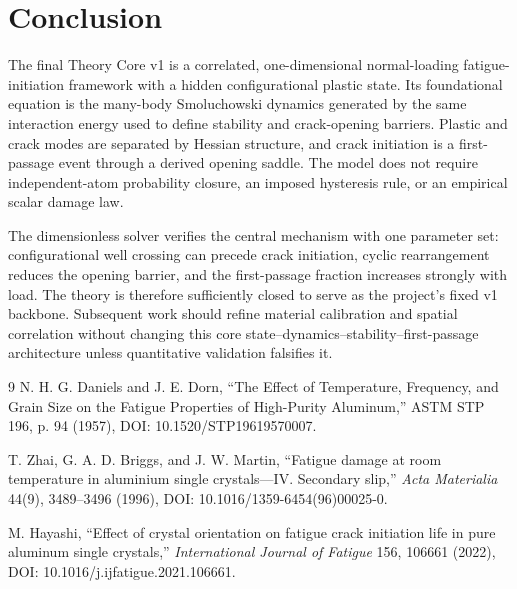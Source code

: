 \documentclass[11pt]{article}
\begin{document}
\section{Conclusion}
The final Theory Core v1 is a correlated, one-dimensional normal-loading fatigue-initiation framework with a hidden configurational plastic state. Its foundational equation is the many-body Smoluchowski dynamics generated by the same interaction energy used to define stability and crack-opening barriers. Plastic and crack modes are separated by Hessian structure, and crack initiation is a first-passage event through a derived opening saddle. The model does not require independent-atom probability closure, an imposed hysteresis rule, or an empirical scalar damage law.

The dimensionless solver verifies the central mechanism with one parameter set: configurational well crossing can precede crack initiation, cyclic rearrangement reduces the opening barrier, and the first-passage fraction increases strongly with load. The theory is therefore sufficiently closed to serve as the project's fixed v1 backbone. Subsequent work should refine material calibration and spatial correlation without changing this core state--dynamics--stability--first-passage architecture unless quantitative validation falsifies it.

\begin{thebibliography}{9}
N. H. G. Daniels and J. E. Dorn,
``The Effect of Temperature, Frequency, and Grain Size on the Fatigue Properties of High-Purity Aluminum,''
ASTM STP 196, p. 94 (1957), DOI: 10.1520/STP19619570007.

T. Zhai, G. A. D. Briggs, and J. W. Martin,
``Fatigue damage at room temperature in aluminium single crystals---IV. Secondary slip,''
\emph{Acta Materialia} 44(9), 3489--3496 (1996), DOI: 10.1016/1359-6454(96)00025-0.

M. Hayashi,
``Effect of crystal orientation on fatigue crack initiation life in pure aluminum single crystals,''
\emph{International Journal of Fatigue} 156, 106661 (2022), DOI: 10.1016/j.ijfatigue.2021.106661.
\end{thebibliography}
\end{document}
